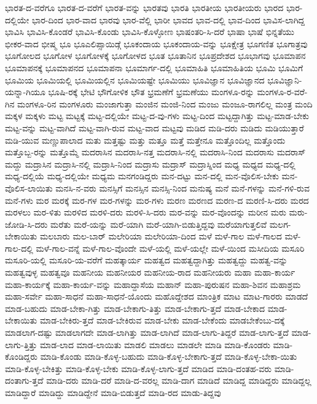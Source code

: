{ಭಾರತ-ದ-ವರೆಗೂ
ಭಾರತ-ದ-ವರೆಗೆ
ಭಾರತ-ವನ್ನು
ಭಾರತವು
ಭಾರತಿ
ಭಾರತೀಯ
ಭಾರತೀಯರು
ಭಾರದ
ಭಾರ-ದಲ್ಲಿಯೇ
ಭಾರ-ದಿಂದ
ಭಾರ-ವಾದ
ಭಾರವು
ಭಾರ-ವೆಲ್ಲಿ
ಭಾರೀ
ಭಾವದ
ಭಾವ-ದಲ್ಲಿ
ಭಾವ-ದಿಂದ
ಭಾವಿಸ-ಲಾಗಿದ್ದ
ಭಾವಿಸಿ
ಭಾವಿಸಿ-ಕೊಂಡರೆ
ಭಾವಿಸಿ-ಕೊಂಡು
ಭಾವಿಸಿ-ಕೊಳ್ಳೋಣ
ಭಾಷಂತರಿ-ಸಿ-ದರೆ
ಭಾಷಾ
ಭಾಷೆ
ಭಿನ್ನತೆಯು
ಭೀಕರ-ವಾದ
ಭೀಷ್ಮ
ಭೂ
ಭೂಎಲಿಪ್ಸಾಯಿಡ್ಗೆ
ಭೂಕಂದಾಯ
ಭೂಕಂದಾಯ-ವನ್ನು
ಭೂಕ್ಷೇತ್ರ
ಭೂಗಣಿತ
ಭೂಗಾತ್ರವು
ಭೂಗೋಲದ
ಭೂಗೋಳ
ಭೂಗೋಳಕ್ಕೆ
ಭೂಗೋಳದ
ಭೂತ
ಭೂತಾನಿನ
ಭೂಪ್ರದೇಶದ
ಭೂಭಾಗವು
ಭೂಮಾಪನ
ಭೂಮಾಪನಕ್ಕೆ
ಭೂಮಾಪನದ
ಭೂಮಾಪನಾ
ಭೂಮಾರ್ಗ-ದಲ್ಲಿ
ಭೂಮಾಹಿತಿ
ಭೂಮಾಹಿತಿಯ
ಭೂಮಿ
ಭೂಮಿಗೆ
ಭೂಮಿಯ
ಭೂಮಿಯಲ್ಲಿ
ಭೂಮಿಯಲ್ಲಿನ
ಭೂಮಿಯಷ್ಟೇ
ಭೂಮಿಯು
ಭೂವಿಜ್ಞಾನ
ಭೂವಿಜ್ಞಾನದ
ಭೂವಿಜ್ಞಾನಿ-ಯನ್ನಾ-ಗಿಯೂ
ಭೂಷಿ-ರಕ್ಕೆ
ಭೇಟಿ
ಭೌಗೋಳಿಕ
ಭೌತ
ಭ್ರಮಣೆಗೆ
ಭ್ರಮಣೆಯು
ಮಂಗಳೂ-ರನ್ನು
ಮಂಗಳೂ-ರ-ವರೆ-ಗಿನ
ಮಂಗಳೂ-ರಿನ
ಮಂಗಳೂರು
ಮಂಜಾಗುತ್ತಾ
ಮಂಜಿನ
ಮಂಜಿ-ನಿಂದ
ಮಂಜು
ಮಂಜೂ-ರಾಗಲಿಲ್ಲ
ಮಂತ್ರ
ಮಂದಿ
ಮಕ್ಕಳ
ಮಕ್ಕಳು
ಮಟ್ಟ
ಮಟ್ಟಕ್ಕೆ
ಮಟ್ಟ-ದಲ್ಲಿಯೇ
ಮಟ್ಟ-ದ-ವು-ಗಳು
ಮಟ್ಟ-ದಿಂದ
ಮಟ್ಟದ್ದಾಗಿತ್ತು
ಮಟ್ಟ-ಮಾಡ-ಬೇಕು
ಮಟ್ಟ-ವನ್ನು
ಮಟ್ಟ-ವಾಗಿದೆ
ಮಟ್ಟ-ವಾಗಿ-ರುವ
ಮಟ್ಟ-ವಾದ
ಮಟ್ಟವು
ಮಡಿದ
ಮಡಿ-ದರು
ಮಡಿದು
ಮಡಿಯುತ್ತಾರೆ
ಮಡಿ-ಯುವ
ಮಣ್ಣುಪಾಲಾದ
ಮತು
ಮತ್ತಷ್ಟು
ಮತ್ತು
ಮತ್ತೂ
ಮತ್ತೆ
ಮತ್ತೇನೂ
ಮತ್ತೊಂದಿಲ್ಲ
ಮತ್ತೊಂದು
ಮತ್ತೊಬ್ಬ-ರನ್ನು
ಮತ್ತೊಮ್ಮೆ
ಮದರಾಸಿನ
ಮದರಾಸಿ-ನತ್ತ
ಮದರಾಸಿ-ನಲ್ಲಿ
ಮದರಾಸಿ-ನಿಂದ
ಮದರಾಸು
ಮದರಾಸ್
ಮದ್ದು
ಮದ್ರಾಸಿನ
ಮದ್ರಾಸಿ-ನಲ್ಲಿ
ಮದ್ರಾಸಿ-ನಿಂದ
ಮದ್ರಾಸು
ಮದ್ರಾಸ್
ಮದ್ರಾಸ್ನಿಂದ
ಮಧ್ಯ
ಮಧ್ಯದ
ಮಧ್ಯ-ದಲ್ಲಿ
ಮಧ್ಯ-ದಲ್ಲಿಯೆ
ಮಧ್ಯ-ದಲ್ಲಿಯೇ
ಮಧ್ಯಮ
ಮನಗಂಡಿದ್ದರು
ಮನ-ದಟ್ಟು
ಮನ-ದಲ್ಲಿ
ಮನ-ವೊಲಿಸ-ಬೇಕು
ಮನ-ವೊಲಿಸ-ಲಾಯಿತು
ಮನಸಿ-ನ-ವರು
ಮನಸ್ಸಿಗೆ
ಮನಸ್ಸಿನ
ಮನಸ್ಸಿ-ನಿಂದ
ಮನುಷ್ಯ
ಮನೆ
ಮನೆ-ಗಳನ್ನು
ಮನೆ-ಗಳಿ-ರುವ
ಮನೆ-ಗಳು
ಮರ
ಮರಕ್ಕೆ
ಮರ-ಗಳ
ಮರ-ಗಳನ್ನು
ಮರ-ಗಳು
ಮರಣ
ಮರಣದ
ಮರಣ-ದ
ಮರಣಿ-ಸಿ-ದರು
ಮರದ
ಮರಳಲು
ಮರ-ಳಿತು
ಮರಳಿದ
ಮರಳಿ-ದರು
ಮರಳಿ-ಸಿ-ದರು
ಮರ-ವನ್ನು
ಮರ-ವೊಂದನ್ನು
ಮರೀನ
ಮರು
ಮರು-ಜೋಡಿ-ಸಿ-ದರು
ಮರೆತು
ಮರೆ-ಯನ್ನು
ಮರೆ-ಯಾಗಿ
ಮರೆ-ಯಾಗಿ-ಬಿಡುತ್ತಿದ್ದವು
ಮರೆಯಾಗುತ್ತಲಿವೆ
ಮಲಗ-ಬೇಕಾಯಿತು
ಮಲಬಾರು
ಮಲ-ಬಾರ್
ಮಲೇರಿಯಾ
ಮಲೇರಿಯಾ-ದಿಂದ
ಮಳೆ
ಮಳೆ-ಗಾಲ
ಮಳೆ-ಗಾಲದ
ಮಳೆ-ಗಾಲ-ದಲ್ಲಿ
ಮಳೆ-ಗಾಲ-ವನ್ನೆ
ಮಳೆ-ಗಾಲ-ವೊಂದೇ
ಮಳೆ-ಯಲ್ಲಿ
ಮಳೆ-ಯಲ್ಲೇ
ಮಳೆ-ಯಿಂದ
ಮಸೀದಿಯ
ಮಸೂರಿ
ಮಸೂರಿ-ಯಲ್ಲಿ
ಮಸೂರಿ-ಯ-ವರೆಗೆ
ಮಹತ್ಕಾರ್ಯ
ಮಹತ್ವದ
ಮಹತ್ವದ್ದಾಗಿತ್ತು
ಮಹತ್ವದ್ದು
ಮಹತ್ವ-ವನ್ನು
ಮಹತ್ವವುಳ್ಳ
ಮಹತ್ವವೂ
ಮಹನೀಯ
ಮಹನೀಯರ
ಮಹನೀಯ-ರಾದ
ಮಹನೀಯರು
ಮಹಾ
ಮಹಾ-ಕಾರ್ಯ
ಮಹಾ-ಕಾರ್ಯಕ್ಕೆ
ಮಹಾ-ಕಾರ್ಯ-ವನ್ನು
ಮಹಾದ್ದಾಸೆಯ
ಮಹಾನ್
ಮಹಾ-ಪುರುಷನ
ಮಹಾ-ಶಿವನ
ಮಹಾಶ್ರಮ
ಮಹಾ-ಸರ್ವೇ
ಮಹಾ-ಸಾಧನೆ
ಮಹಾ-ಸಾಧನೆ-ಯೊಂದು
ಮಹೊದ್ದೇಶದ
ಮಾಂತ್ರಿಕ
ಮಾಟ
ಮಾಟ-ಗಾರರು
ಮಾಡದೆ
ಮಾಡ-ಬಹುದು
ಮಾಡ-ಬೇಕಾ-ಗಿತ್ತು
ಮಾಡ-ಬೇಕಾಗು-ತಿತ್ತು
ಮಾಡ-ಬೇಕಾಗು-ತ್ತದೆ
ಮಾಡ-ಬೇಕಾದ
ಮಾಡ-ಬೇಕಾಯಿತು
ಮಾಡ-ಬೇಕಿರು-ತ್ತದೆ
ಮಾಡ-ಬೇಕಿರುವ
ಮಾಡ-ಬೇಕು
ಮಾಡ-ಬೇಕೆಂದು
ಮಾಡಬೇಕೆಂಬು-ದಕ್ಕೆ
ಮಾಡಲಾಗ-ದಷ್ಟು
ಮಾಡಲಾಗದೇ
ಮಾಡ-ಲಾಗಿತ್ತು
ಮಾಡ-ಲಾಗಿದೆ
ಮಾಡ-ಲಾಗು-ತಿದ್ದರೆ
ಮಾಡ-ಲಾಗು-ತ್ತದೆ
ಮಾಡ-ಲಾಗು-ತ್ತಿತ್ತು
ಮಾಡ-ಲಾದ
ಮಾಡ-ಲಾಯಿತು
ಮಾಡಲಿ
ಮಾಡಲು
ಮಾಡಲೇ
ಮಾಡಿ
ಮಾಡಿ-ಕೊಂಡರು
ಮಾಡಿ-ಕೊಂಡಿದ್ದರು
ಮಾಡಿ-ಕೊಂಡು
ಮಾಡಿ-ಕೊಳ್ಳ-ಬಹುದು
ಮಾಡಿ-ಕೊಳ್ಳ-ಬೇಕಾಗು-ತ್ತದೆ
ಮಾಡಿ-ಕೊಳ್ಳ-ಬೇಕಾ-ಯಿತು
ಮಾಡಿ-ಕೊಳ್ಳ-ಬೇಕಿತ್ತು
ಮಾಡಿ-ಕೊಳ್ಳ-ಬೇಕು
ಮಾಡಿ-ಕೊಳ್ಳ-ಲಾಗು-ತ್ತದೆ
ಮಾಡಿದ
ಮಾಡಿ-ದಂತಹ-ವರು
ಮಾಡಿ-ದಂತಾಗು-ತ್ತದೆ
ಮಾಡಿ-ದರು
ಮಾಡಿ-ದರೆ
ಮಾಡಿ-ದ-ವರಲ್ಲ
ಮಾಡಿ-ದಾಗ
ಮಾಡಿದೆ
ಮಾಡಿದ್ದ
ಮಾಡಿದ್ದರು
ಮಾಡಿದ್ದಲ್ಲ
ಮಾಡಿದ್ದಾರೆ
ಮಾಡಿದ್ದು
ಮಾಡಿದ್ದೇನೆ
ಮಾಡಿ-ಬಿಡುತ್ತದೆ
ಮಾಡಿ-ರದ
ಮಾಡು-ತಿದ್ದವು
}

